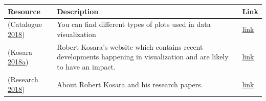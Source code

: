 \documentclass[]{book}
\theoremstyle{definition}
\theoremstyle{definition}
\theoremstyle{definition}
\theoremstyle{remark}
\begin{document}
\begin{longtable}[]{@{}lll@{}}
\toprule
\begin{minipage}[b]{0.15\columnwidth}\raggedright\strut
\textbf{Resource}\strut
\end{minipage} & \begin{minipage}[b]{0.28\columnwidth}\raggedright\strut
\textbf{Description}\strut
\end{minipage} & \begin{minipage}[b]{0.48\columnwidth}\raggedright\strut
\textbf{Link}\strut
\end{minipage}\tabularnewline
\midrule
\endhead
\begin{minipage}[t]{0.15\columnwidth}\raggedright\strut
(Catalogue \protect\hyperlink{ref-charts_viz}{2018})\strut
\end{minipage} & \begin{minipage}[t]{0.28\columnwidth}\raggedright\strut
You can find different types of plots used in data visualization\strut
\end{minipage} & \begin{minipage}[t]{0.48\columnwidth}\raggedright\strut
\href{https://datavizcatalogue.com/search.html}{link}\strut
\end{minipage}\tabularnewline
\begin{minipage}[t]{0.15\columnwidth}\raggedright\strut
(Kosara
\protect\hyperlink{ref-eagereyes_viz}{2018}\protect\hyperlink{ref-eagereyes_viz}{a})\strut
\end{minipage} & \begin{minipage}[t]{0.28\columnwidth}\raggedright\strut
Robert Kosara's website which contains recent developments happening in
visualization and are likely to have an impact.\strut
\end{minipage} & \begin{minipage}[t]{0.48\columnwidth}\raggedright\strut
\href{https://eagereyes.org/}{link}\strut
\end{minipage}\tabularnewline
\begin{minipage}[t]{0.15\columnwidth}\raggedright\strut
(Research \protect\hyperlink{ref-research_viz}{2018})\strut
\end{minipage} & \begin{minipage}[t]{0.28\columnwidth}\raggedright\strut
About Robert Kosara and his research papers.\strut
\end{minipage} & \begin{minipage}[t]{0.48\columnwidth}\raggedright\strut
\href{http://researchviz.com/}{link}\strut
\end{minipage}\tabularnewline

\end{longtable}
\end{document}
